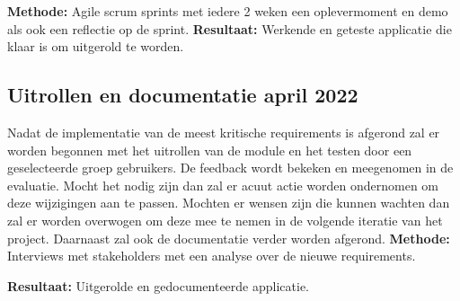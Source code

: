 \textbf{Methode:} Agile scrum sprints met iedere 2 weken een oplevermoment en demo als ook een reflectie op de sprint.
\textbf{Resultaat:} Werkende en geteste applicatie die klaar is om uitgerold te worden.

\subsection{Uitrollen en documentatie \textbf{april 2022 }}\label{subsec:uitrollen-en-documentatie}
Nadat de implementatie van de meest kritische requirements is afgerond zal er worden begonnen met het uitrollen van de module en het testen door een geselecteerde groep gebruikers. De feedback wordt bekeken en meegenomen in de evaluatie. Mocht het nodig zijn dan zal er acuut actie worden ondernomen om deze wijzigingen aan te passen. Mochten er wensen zijn die kunnen wachten dan zal er worden overwogen om deze mee te nemen in de volgende iteratie van het project. Daarnaast zal ook de documentatie verder worden afgerond.
\textbf{Methode:} Interviews met stakeholders met een analyse over de nieuwe requirements.

\textbf{Resultaat:} Uitgerolde en gedocumenteerde applicatie.
